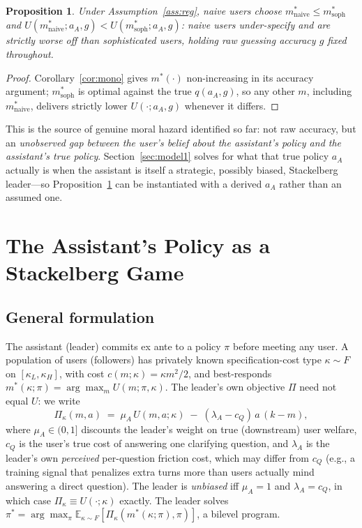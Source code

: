 \documentclass[11pt]{article}
\newtheorem{proposition}{Proposition}
\begin{document}
\begin{proposition}\label{prop:bias}
Under Assumption~\ref{ass:reg}, naive users choose
$m^*_{\text{naive}} \le m^*_{\text{soph}}$ and
$U(m^*_{\text{naive}};a_A,g) < U(m^*_{\text{soph}};a_A,g)$: naive users
under-specify and are strictly worse off than sophisticated users, holding raw
guessing accuracy $g$ fixed throughout.
\end{proposition}

\begin{proof}
Corollary~\ref{cor:mono} gives $m^*(\cdot)$ non-increasing in its accuracy
argument; $m^*_{\text{soph}}$ is optimal against the true $q(a_A,g)$, so any other
$m$, including $m^*_{\text{naive}}$, delivers strictly lower $U(\cdot;a_A,g)$
whenever it differs.
\end{proof}

This is the source of genuine moral hazard identified so far: not raw accuracy, but
an \emph{unobserved gap between the user's belief about the assistant's policy and
the assistant's true policy}. Section~\ref{sec:model1} solves for what that true
policy $a_A$ actually is when the assistant is itself a strategic, possibly biased,
Stackelberg leader---so Proposition~\ref{prop:bias} can be instantiated with a
derived $a_A$ rather than an assumed one.

\section{The Assistant's Policy as a Stackelberg Game}
\label{sec:stackelberg}

\subsection{General formulation}

The assistant (leader) commits ex ante to a policy $\pi$ before meeting any user.
A population of users (followers) has privately known specification-cost type
$\kappa \sim F$ on $[\kappa_L,\kappa_H]$, with cost $c(m;\kappa)=\kappa m^2/2$, and
best-responds $m^*(\kappa;\pi) = \arg\max_m U(m;\pi,\kappa)$. The leader's own
objective $\Pi$ need not equal $U$: we write
\[
\Pi_\kappa(m,a) \;=\; \mu_A\, U(m,a;\kappa) \;-\; (\lambda_A - c_Q)\, a\,(k-m),
\]
where $\mu_A \in (0,1]$ discounts the leader's weight on true (downstream) user
welfare, $c_Q$ is the user's true cost of answering one clarifying question, and
$\lambda_A$ is the leader's own \emph{perceived} per-question friction cost, which
may differ from $c_Q$ (e.g., a training signal that penalizes extra turns more
than users actually mind answering a direct question). The leader is
\emph{unbiased} iff $\mu_A=1$ and $\lambda_A=c_Q$, in which case $\Pi_\kappa \equiv
U(\cdot;\kappa)$ exactly. The leader solves
$\pi^* = \arg\max_\pi \mathbb{E}_{\kappa\sim F}[\Pi_\kappa(m^*(\kappa;\pi),\pi)]$,
a bilevel program.
\end{document}
